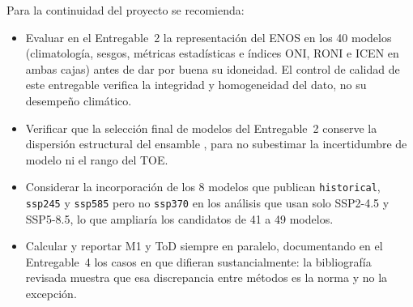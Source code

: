 Para la continuidad del proyecto se recomienda:

\begin{itemize}
\item Evaluar en el Entregable~2 la representación del ENOS en los 40 modelos (climatología, sesgos, métricas estadísticas e índices ONI, RONI e ICEN en ambas cajas) antes de dar por buena su idoneidad. El control de calidad de este entregable verifica la integridad y homogeneidad del dato, no su desempeño climático.
\item Verificar que la selección final de modelos del Entregable~2 conserve la dispersión estructural del ensamble \citep{lois2026}, para no subestimar la incertidumbre de modelo ni el rango del TOE.
\item Considerar la incorporación de los 8 modelos que publican \texttt{historical}, \texttt{ssp245} y \texttt{ssp585} pero no \texttt{ssp370} en los análisis que usan solo SSP2-4.5 y SSP5-8.5, lo que ampliaría los candidatos de 41 a 49 modelos.
\item Calcular y reportar M1 y ToD siempre en paralelo, documentando en el Entregable~4 los casos en que difieran sustancialmente: la bibliografía revisada muestra que esa discrepancia entre métodos es la norma y no la excepción.
\end{itemize}

